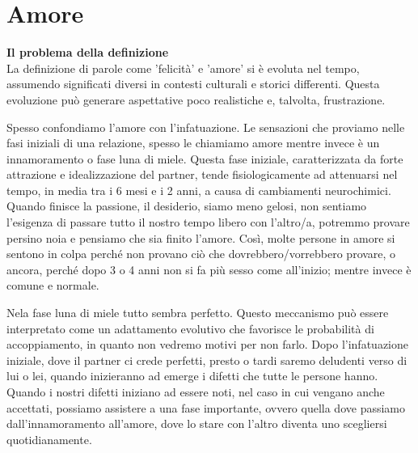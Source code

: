 \documentclass[12pt]{book} %
\begin{document}
\clearpage\section{Amore}
\noindent \textbf{\large Il problema della definizione} \\
La definizione di parole come 'felicità' e 'amore' si è evoluta nel tempo, assumendo significati diversi in contesti culturali e storici differenti. Questa evoluzione può generare aspettative poco realistiche e, talvolta, frustrazione.

Spesso confondiamo l'amore con l'infatuazione. Le sensazioni che proviamo nelle fasi iniziali di una relazione, spesso le chiamiamo amore mentre invece è un innamoramento o fase luna di miele. Questa fase iniziale, caratterizzata da forte attrazione e idealizzazione del partner, tende fisiologicamente ad attenuarsi nel tempo, in media tra i 6 mesi e i 2 anni, a causa di cambiamenti neurochimici. Quando finisce la passione, il desiderio, siamo meno gelosi, non sentiamo
l'esigenza di passare tutto il nostro tempo libero con l'altro/a, potremmo provare persino
noia e pensiamo che sia finito l'amore. Così, molte persone in amore si sentono
in colpa perché non provano ciò che dovrebbero/vorrebbero provare, o ancora, perché dopo 3 o 4 anni non si fa più sesso come all'inizio; mentre invece è comune e normale.

Nela fase luna di miele tutto sembra perfetto. Questo meccanismo può essere interpretato come un adattamento evolutivo che favorisce le probabilità di accoppiamento, in quanto non vedremo motivi per non farlo. Dopo l'infatuazione iniziale, dove il partner ci crede perfetti, presto o tardi saremo
deludenti verso di lui o lei, quando inizieranno ad emerge i difetti che tutte le persone hanno. Quando
i nostri difetti iniziano ad essere noti, nel caso in cui vengano anche accettati, possiamo assistere a una fase
importante, ovvero quella dove passiamo dall'innamoramento all'amore, dove lo
stare con l'altro diventa uno scegliersi quotidianamente. 
\end{document}
